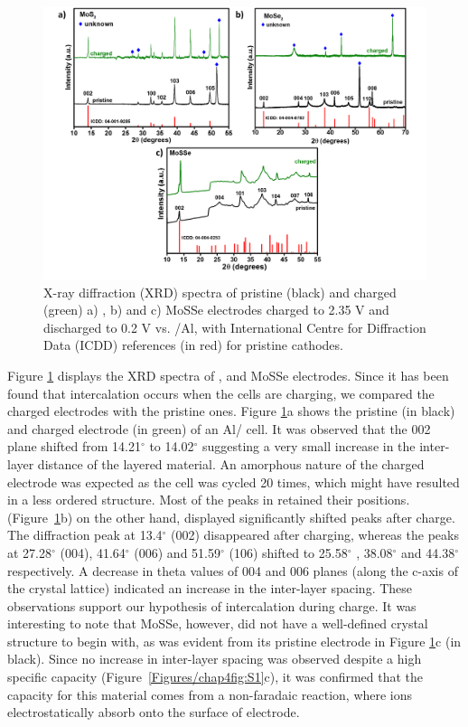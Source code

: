 \begin{figure}[htb!]
\centering
\includegraphics[width=\textwidth]{Figures/chap4fig/XRD}
\caption{X-ray diffraction (XRD) spectra of pristine (black) and charged (green) a) , b)  and c) MoSSe electrodes charged to 2.35 V and discharged to 0.2 V vs. /Al, with International Centre for Diffraction Data (ICDD) references (in red) for pristine cathodes.}
\label{Figures/chap4fig:XRD}
\end{figure}

Figure \ref{Figures/chap4fig:XRD} displays the XRD spectra of ,  and MoSSe electrodes. Since it has been found that intercalation occurs when the cells are charging, we compared the charged electrodes with the pristine ones. Figure \ref{Figures/chap4fig:XRD}a shows the pristine (in black) and charged electrode (in green) of an Al/ cell. It was observed that the 002 plane shifted from 14.21$^\circ$ to 14.02$^\circ$ suggesting a very small increase in the inter-layer distance of the layered material. An amorphous nature of the charged electrode was expected as the cell was cycled 20 times, which might have resulted in a less ordered structure. Most of the peaks in  retained their positions.  (Figure\ \ref{Figures/chap4fig:XRD}b) on the other hand, displayed significantly shifted peaks after charge. The diffraction peak at 13.4$^\circ$ (002) disappeared after charging, whereas the peaks at 27.28$^\circ$ (004), 41.64$^\circ$ (006) and 51.59$^\circ$ (106) shifted to 25.58$^\circ$ , 38.08$^\circ$  and 44.38$^\circ$ respectively. A decrease in theta values of 004 and 006 planes (along the c-axis of the crystal lattice) indicated an increase in the inter-layer spacing. These observations support our hypothesis of  intercalation during charge. It was interesting to note that MoSSe, however, did not have a well-defined crystal structure to begin with, as was evident from its pristine electrode in Figure \ref{Figures/chap4fig:XRD}c (in black). Since no increase in inter-layer spacing was observed despite a high specific capacity (Figure\ \ref{Figures/chap4fig:S1}c), it was confirmed that the capacity for this material comes from a non-faradaic reaction,  where ions electrostatically absorb onto the surface of electrode. 

